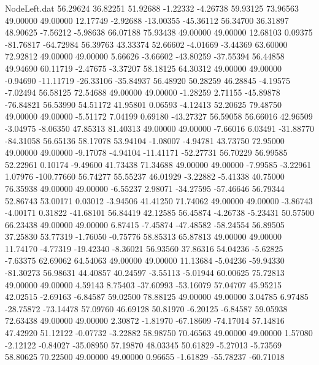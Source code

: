 \begin{filecontents}{NodeLeft.dat}
  56.29624   36.82251   51.92688    -1.22332   -4.26738   59.93125   73.96563   49.00000   49.00000   12.17749   -2.92688  -13.00355  -45.36112
  56.34700   36.31897   48.90625    -7.56212   -5.98638   66.07188   75.93438   49.00000   49.00000   12.68103    0.09375  -81.76817  -64.72984
  56.39763   43.33374   52.66602    -4.01669   -3.44369   63.60000   72.92812   49.00000   49.00000    5.66626   -3.66602  -43.80259  -37.55394
  56.44858   49.94690   60.11719    -2.47675   -3.37207   58.18125   64.30312   49.00000   49.00000   -0.94690  -11.11719  -26.33106  -35.84937
  56.48920   50.28259   46.28845    -4.19575   -7.02494   56.58125   72.54688   49.00000   49.00000   -1.28259    2.71155  -45.89878  -76.84821
  56.53990   54.51172   41.95801     0.06593   -4.12413   52.20625   79.48750   49.00000   49.00000   -5.51172    7.04199    0.69180  -43.27327
  56.59058   56.66016   42.96509    -3.04975   -8.06350   47.85313   81.40313   49.00000   49.00000   -7.66016    6.03491  -31.88770  -84.31058
  56.65136   58.17078   53.94104    -1.08007   -4.94781   43.73750   72.95000   49.00000   49.00000   -9.17078   -4.94104  -11.41171  -52.27731
  56.70229   56.99585   52.22961     0.10174   -9.49600   41.73438   71.34688   49.00000   49.00000   -7.99585   -3.22961    1.07976 -100.77660
  56.74277   55.55237   46.01929    -3.22882   -5.41338   40.75000   76.35938   49.00000   49.00000   -6.55237    2.98071  -34.27595  -57.46646
  56.79344   52.86743   53.00171     0.03012   -3.94506   41.41250   71.74062   49.00000   49.00000   -3.86743   -4.00171    0.31822  -41.68101
  56.84419   42.12585   56.45874    -4.26738   -5.23431   50.57500   66.23438   49.00000   49.00000    6.87415   -7.45874  -47.48582  -58.24554
  56.89505   37.25830   53.77319    -1.76050   -0.75776   58.85313   65.87813   49.00000   49.00000   11.74170   -4.77319  -19.42340   -8.36021
  56.93560   37.86316   54.04236    -5.62825   -7.63375   62.69062   64.54063   49.00000   49.00000   11.13684   -5.04236  -59.94330  -81.30273
  56.98631   44.40857   40.24597    -3.55113   -5.01944   60.00625   75.72813   49.00000   49.00000    4.59143    8.75403  -37.60993  -53.16079
  57.04707   45.95215   42.02515    -2.69163   -6.84587   59.02500   78.88125   49.00000   49.00000    3.04785    6.97485  -28.75872  -73.14478
  57.09760   46.69128   50.81970    -6.20125   -6.84587   59.05938   72.63438   49.00000   49.00000    2.30872   -1.81970  -67.18609  -74.17014
  57.14816   47.42920   51.12122    -0.07732   -3.22882   58.98750   70.46563   49.00000   49.00000    1.57080   -2.12122   -0.84027  -35.08950
  57.19870   48.03345   50.61829    -5.27013   -5.73569   58.80625   70.22500   49.00000   49.00000    0.96655   -1.61829  -55.78237  -60.71018

\end{filecontents}
